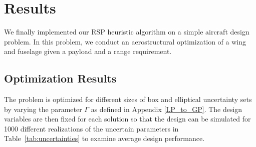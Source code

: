 \section{Results}

We finally implemented our RSP heuristic algorithm on a simple aircraft design problem. 
In this problem, we conduct an aerostructural optimization of a wing and fuselage given a payload and a range requirement. 


\subsection{Optimization Results}

The problem is optimized for different sizes of box and elliptical uncertainty sets
by varying the parameter $\Gamma$ as defined in Appendix \ref{LP_to_GP}.
The design variables are then fixed for each solution so that the design can be simulated for
1000 different realizations of the uncertain parameters in Table~\ref{tab:uncertainties}
to examine average design performance.\\

